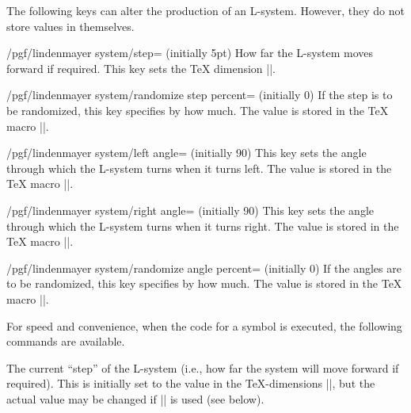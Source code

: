 \begin{command}{\pgfdeclarelindenmayersystem{}}
\begin{command}{\symbol{}}
        The following keys can alter the production of an L-system. However,
        they do not store values in themselves.

        \begin{key}{/pgf/lindenmayer system/step= (initially 5pt)}
            How far the L-system moves forward if required. This key sets the
            \TeX{} dimension |\pgflsystemstep|.
        \end{key}

        \begin{key}{/pgf/lindenmayer system/randomize step percent= (initially 0)}
            If the step is to be randomized, this key specifies by how much.
            The value is stored in the \TeX{} macro
            |\pgflsystemrandomizesteppercent|.
        \end{key}

        \begin{key}{/pgf/lindenmayer system/left angle= (initially 90)}
            This key sets the angle through which the L-system turns when it
            turns left. The value is stored in the \TeX{} macro
            |\pgflsystemrleftangle|.
        \end{key}

        \begin{key}{/pgf/lindenmayer system/right angle= (initially 90)}
            This key sets the angle through which the L-system turns when it
            turns right. The value is stored in the \TeX{} macro
            |\pgflsystemrrightangle|.
        \end{key}

        \begin{key}{/pgf/lindenmayer system/randomize angle percent= (initially 0)}
            If the angles are to be randomized, this key specifies by how much.
            The value is stored in the \TeX{} macro
            |\pgflsystemrandomizeanglepercent|.
        \end{key}

        For speed and convenience, when the code for a symbol is executed, the
        following commands are available.

        \begin{command}{\pgflsystemcurrentstep}
            The current ``step'' of the L-system (i.e., how far the system
            will move forward if required). This is initially set to the
            value in the \TeX-dimensions |\pgflsystemstep|, but the actual
            value may be changed if |\pgflsystemrandomizestep| is used
            (see below).
        \end{command}


\end{command}
\end{command}
